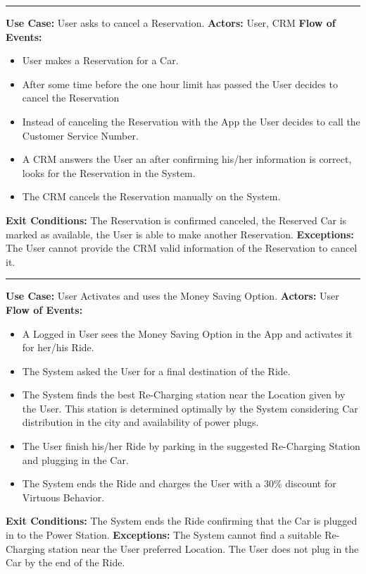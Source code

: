 \documentclass[a4paper]{article}
\begin{document}
\begin{center}
\rule{8cm}{0.4pt}
\end{center}
\textbf{Use Case:} User asks to cancel a Reservation.
\newline
\textbf{Actors:} User, CRM
\newline
\textbf{Flow of Events:}
\begin{itemize}
\item User makes a Reservation for a Car.
\item After some time before the one hour limit has passed the User decides to cancel the Reservation
\item Instead of canceling the Reservation with the App the User decides to call the Customer Service Number.
\item A CRM answers the User an after confirming his/her information is correct, looks for the Reservation in the System.
\item The CRM cancels the Reservation manually on the System.
\end{itemize}
\textbf{Exit Conditions:} The Reservation is confirmed canceled, the Reserved Car is marked as available, the User is able to make another Reservation.
\newline
\textbf{Exceptions:} The User cannot provide the CRM valid information of the Reservation to cancel it.
\newline

\begin{center}
\rule{8cm}{0.4pt}
\newpage
\end{center}
\textbf{Use Case:} User Activates and uses the Money Saving Option.
\newline
\textbf{Actors:} User
\newline
\textbf{Flow of Events:}
\begin{itemize}
\item A Logged in User sees the Money Saving Option in the App and activates it for her/his Ride.
\item The System asked the User for a final destination of the Ride.
\item The System finds the best Re-Charging station near the Location given by the User. This station is determined optimally by the System considering Car distribution in the city and availability of power plugs.
\item The User finish his/her Ride by parking in the suggested Re-Charging Station and plugging in the Car.
\item The System ends the Ride and charges the User with a 30\% discount for Virtuous Behavior.
\end{itemize}
\textbf{Exit Conditions:} The System ends the Ride confirming that the Car is plugged in to the Power Station.
\newline
\textbf{Exceptions:} The System cannot find a suitable Re-Charging station near the User preferred Location. The User does not plug in the Car by the end of the Ride.
\newline
\end{document}
